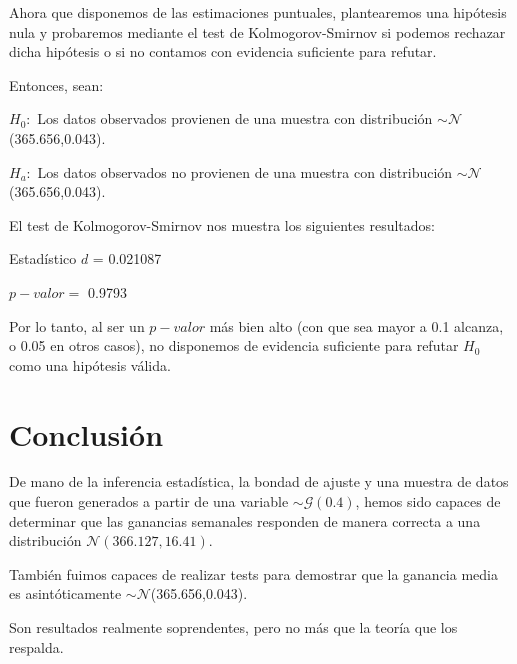 \documentclass[a4paper,10pt]{article}
\begin{document}
\vspace{0.1in}
Ahora que disponemos de las estimaciones puntuales, plantearemos una hipótesis nula y probaremos
mediante el test de Kolmogorov-Smirnov si podemos rechazar dicha hipótesis o si no contamos con
evidencia suficiente para refutar.


Entonces, sean:
\vspace{0.2in}

\noindent$H_0:$ Los datos observados provienen de una muestra con distribución $\sim \mathcal{N}$(365.656,0.043).
\vspace{0.11in}

\noindent$H_a:$ Los datos observados no provienen de una muestra con distribución $\sim \mathcal{N}$(365.656,0.043).
\vspace{0.2in}


El test de Kolmogorov-Smirnov nos muestra los siguientes resultados:

\vspace{0.2in}

\noindent Estadístico $d$ = 0.021087
\vspace{0.2in}

\noindent$p-valor =$ 0.9793
\vspace{0.2in}

Por lo tanto, al ser un $p-valor$ más bien alto (con que sea mayor a 0.1 alcanza, o 0.05 en otros casos), no disponemos de evidencia suficiente para
refutar $H_0$ como una hipótesis válida.

\pagebreak

\section*{Conclusión}

De mano de la inferencia estadística, la bondad de ajuste y una muestra de datos que fueron generados a partir de
una variable $\sim \mathcal{G}(0.4)$, hemos sido capaces de determinar que las ganancias semanales responden de manera
correcta a una distribución $\mathcal{N}(366.127,16.41)$.

También fuimos capaces de realizar tests para demostrar que la ganancia media es asintóticamente $\sim \mathcal{N}$(365.656,0.043).

Son resultados realmente soprendentes, pero no más que la teoría que los respalda.
\end{document}
